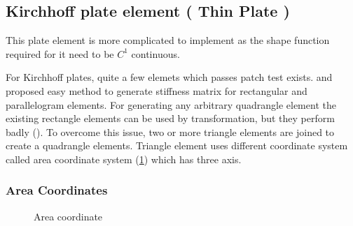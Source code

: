 \documentclass[main.tex]{subfiles}
\begin{document}
\subsection{Kirchhoff plate element ( Thin Plate )}


This plate element is more complicated to implement as the shape function required for it need to be $C^1$ continuous.

For Kirchhoff plates, quite a few elemets which passes patch test exists. \cite{doi:10.1002/nme.1620020210} and \cite{doi:10.1680/iicep.1964.10014} proposed easy method to generate stiffness matrix for rectangular and parallelogram elements. For generating any arbitrary quadrangle element the existing rectangle elements can be used by transformation, but they perform badly (\cite{ZIENKIE_BOOK_STRUCT_CH11}). To overcome this issue, two or more triangle elements are joined to create a quadrangle elements. Triangle element uses different coordinate system called area coordinate system (\ref{fig:areacord}) which has three axis.

\subsubsection{Area Coordinates}


\begin{figure}[h!]
\centering


\caption{Area coordinate} 
\label{fig:areacord}
\end{figure}
\end{document}
